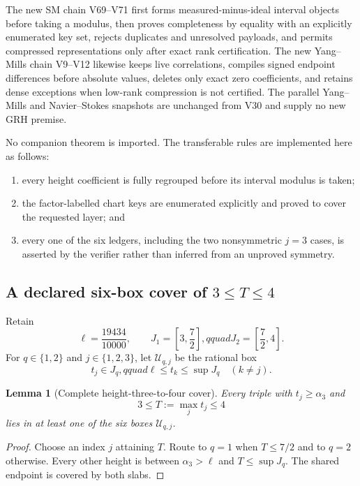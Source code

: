 \documentclass[11pt]{article}
\newtheorem{lemma}[theorem]{Lemma}
\theoremstyle{definition}
\theoremstyle{remark}
\begin{document}
The new SM chain V69--V71 first forms measured-minus-ideal interval
objects before taking a modulus, then proves completeness by equality with
an explicitly enumerated key set, rejects duplicates and unresolved
payloads, and permits compressed representations only after exact rank
certification.  The new Yang--Mills chain V9--V12 likewise keeps live
correlations, compiles signed endpoint differences before absolute values,
deletes only exact zero coefficients, and retains dense exceptions when
low-rank compression is not certified.  The parallel Yang--Mills and
Navier--Stokes snapshots are unchanged from V30 and supply no new GRH
premise.

No companion theorem is imported.  The transferable rules are implemented
here as follows:
\begin{enumerate}[label=\textup{(\roman*)}]
\item every height coefficient is fully regrouped before its interval
      modulus is taken;
\item the factor-labelled chart keys are enumerated explicitly and proved
      to cover the requested layer; and
\item every one of the six ledgers, including the two nonsymmetric
      \(j=3\) cases, is asserted by the verifier rather than inferred from
      an unproved symmetry.
\end{enumerate}

\subsection{A declared six-box cover of \texorpdfstring{\(3\leq T\leq4\)}{3 <= T <= 4}}

Retain
\[
 \ell=\frac{19434}{10000},\qquad
 J_1=\left[3,\frac72\right],qquad
 J_2=\left[\frac72,4\right].
\tag{N40.2}
\]
For \(q\in\{1,2\}\) and \(j\in\{1,2,3\}\), let
\(\mathcal U_{q,j}\) be the rational box
\[
 t_j\in J_q,qquad
 \ell\leq t_k\leq\sup J_q\quad(k\neq j).
\tag{N40.3}
\]

\begin{lemma}[Complete height-three-to-four cover]
\label{lem:f2v40-cover}
Every triple with \(t_j\geq\alpha_3\) and
\[
 3\leq T:=\max_jt_j\leq4
\tag{N40.4}
\]
lies in at least one of the six boxes \(\mathcal U_{q,j}\).
\end{lemma}

\begin{proof}
Choose an index \(j\) attaining \(T\).  Route to \(q=1\) when
\(T\leq7/2\) and to \(q=2\) otherwise.  Every other height is between
\(\alpha_3>\ell\) and \(T\leq\sup J_q\).  The shared endpoint is covered
by both slabs.
\end{proof}
\end{document}
